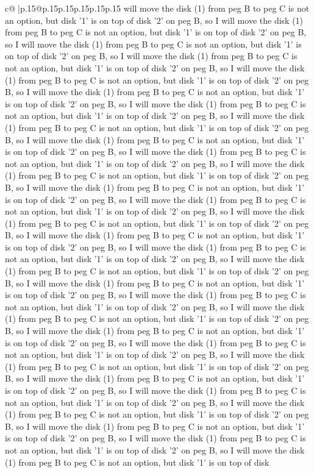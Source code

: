 \documentclass{article}
\begin{document}
{\begin{supertabular}{c@{$\;$}|p{.15\linewidth}@{}p{.15\linewidth}p{.15\linewidth}p{.15\linewidth}p{.15\linewidth}p{.15\linewidth}}
{{{will move the disk (1) from peg B to peg C is not an option, but disk '1' is on top of disk '2' on peg B, so I will move the disk (1) from peg B to peg C is not an option, but disk '1' is on top of disk '2' on peg B, so I will move the disk (1) from peg B to peg C is not an option, but disk '1' is on top of disk '2' on peg B, so I will move the disk (1) from peg B to peg C is not an option, but disk '1' is on top of disk '2' on peg B, so I will move the disk (1) from peg B to peg C is not an option, but disk '1' is on top of disk '2' on peg B, so I will move the disk (1) from peg B to peg C is not an option, but disk '1' is on top of disk '2' on peg B, so I will move the disk (1) from peg B to peg C is not an option, but disk '1' is on top of disk '2' on peg B, so I will move the disk (1) from peg B to peg C is not an option, but disk '1' is on top of disk '2' on peg B, so I will move the disk (1) from peg B to peg C is not an option, but disk '1' is on top of disk '2' on peg B, so I will move the disk (1) from peg B to peg C is not an option, but disk '1' is on top of disk '2' on peg B, so I will move the disk (1) from peg B to peg C is not an option, but disk '1' is on top of disk '2' on peg B, so I will move the disk (1) from peg B to peg C is not an option, but disk '1' is on top of disk '2' on peg B, so I will move the disk (1) from peg B to peg C is not an option, but disk '1' is on top of disk '2' on peg B, so I will move the disk (1) from peg B to peg C is not an option, but disk '1' is on top of disk '2' on peg B, so I will move the disk (1) from peg B to peg C is not an option, but disk '1' is on top of disk '2' on peg B, so I will move the disk (1) from peg B to peg C is not an option, but disk '1' is on top of disk '2' on peg B, so I will move the disk (1) from peg B to peg C is not an option, but disk '1' is on top of disk '2' on peg B, so I will move the disk (1) from peg B to peg C is not an option, but disk '1' is on top of disk '2' on peg B, so I will move the disk (1) from peg B to peg C is not an option, but disk '1' is on top of disk '2' on peg B, so I will move the disk (1) from peg B to peg C is not an option, but disk '1' is on top of disk '2' on peg B, so I will move the disk (1) from peg B to peg C is not an option, but disk '1' is on top of disk '2' on peg B, so I will move the disk (1) from peg B to peg C is not an option, but disk '1' is on top of disk '2' on peg B, so I will move the disk (1) from peg B to peg C is not an option, but disk '1' is on top of disk '2' on peg B, so I will move the disk (1) from peg B to peg C is not an option, but disk '1' is on top of disk '2' on peg B, so I will move the disk (1) from peg B to peg C is not an option, but disk '1' is on top of disk '2' on peg B, so I will move the disk (1) from peg B to peg C is not an option, but disk '1' is on top of disk '2' on peg B, so I will move the disk (1) from peg B to peg C is not an option, but disk '1' is on top of disk '2' on peg B, so I will move the disk (1) from peg B to peg C is not an option, but disk '1' is on top of disk '2' on peg B, so I will move the disk (1) from peg B to peg C is not an option, but disk '1' is on top of disk }}}
\end{supertabular}}
\end{document}
